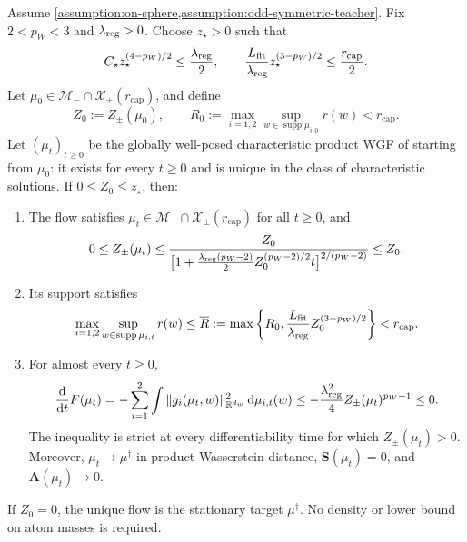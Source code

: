 \begin{proposition}
\label{prop:reduced-dissipation-antisymmetric-branch}
Assume \cref{assumption:on-sphere,assumption:odd-symmetric-teacher}.
Fix \(2<p_W<3\) and \(\lambda_{\mathrm{reg}}>0\). Choose \(z_\star>0\) such that
\begin{equation}
\label{eq:mf-local-basin-threshold}
 C_\star z_\star^{(4-p_W)/2}\le\frac{\lambda_{\mathrm{reg}}}{2},\qquad
 \frac{L_{\mathrm{fit}}}{\lambda_{\mathrm{reg}}}z_\star^{(3-p_W)/2}
 \le\frac{r_{\mathrm{cap}}}{2}.
\end{equation}
Let \(\mu_0\in\mathcal M_-\cap\mathcal X_\pm(r_{\mathrm{cap}})\), and define
\begin{equation}
\label{eq:mf-local-initial-data}
 Z_0:=Z_\pm(\mu_0),\qquad
 R_0:=\max_{i=1,2}\sup_{w\in\operatorname{supp}\mu_{i,0}}r(w)
 <r_{\mathrm{cap}}.
\end{equation}
Let \((\mu_t)_{t\ge0}\) be the globally well-posed characteristic product WGF
of 
starting from \(\mu_0\): it exists for every \(t\ge0\) and is unique in the
class of characteristic solutions. If \(0\le Z_0\le z_\star\), then:
\begin{enumerate}[label=(\roman*),leftmargin=*]
\item The flow satisfies
\(\mu_t\in\mathcal M_-\cap\mathcal X_\pm(r_{\mathrm{cap}})\) for all
\(t\ge0\), and
\begin{equation}
\label{eq:mf-local-distance-decay}
 0\le Z_\pm(\mu_t)\le
 \frac{Z_0}{\bigl[1+\tfrac{\lambda_{\mathrm{reg}}(p_W-2)}2
                   Z_0^{(p_W-2)/2}t\bigr]^{2/(p_W-2)}}
 \le Z_0.
\end{equation}
\item Its support satisfies
\begin{equation}
\label{eq:mf-local-support-barrier}
 \max_{i=1,2}\sup_{w\in\operatorname{supp}\mu_{i,t}}r(w)
 \le\overline R:=\max\left\{R_0,
        \frac{L_{\mathrm{fit}}}{\lambda_{\mathrm{reg}}}Z_0^{(3-p_W)/2}\right\}
 <r_{\mathrm{cap}}.
\end{equation}
\item For almost every \(t\ge0\),
\begin{equation}
\label{eq:mf-local-energy-dissipation}
 \frac{\dd}{\dd t}F(\mu_t)
 =-\sum_{i=1}^2\int
       \|g_i(\mu_t,w)\|_{\mathbb R^{d_w}}^2\,\dd\mu_{i,t}(w)
 \le-\frac{\lambda_{\mathrm{reg}}^2}{4}Z_\pm(\mu_t)^{p_W-1}\le0.
\end{equation}
The inequality is strict at every differentiability time for which
\(Z_\pm(\mu_t)>0\). Moreover, \(\mu_t\to\mu^\dagger\) in product
Wasserstein distance, \(\mathbf S(\mu_t)=0\), and
\(\mathbf A(\mu_t)\to0\).
\end{enumerate}
If \(Z_0=0\), the unique flow is the stationary target \(\mu^\dagger\).
No density or lower bound on atom masses is required.
\end{proposition}

